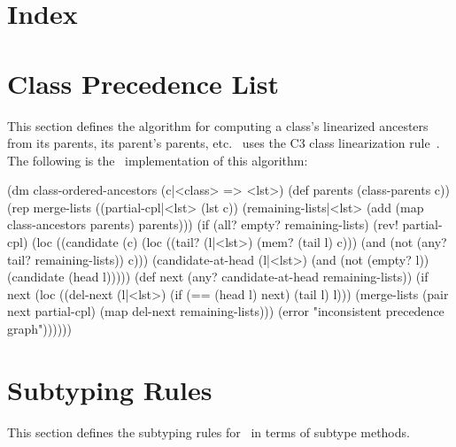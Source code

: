 \documentclass[twoside,twocolumn,9pt]{extarticle}
\begin{document}
\W\section*{Index}
\W\htmlprintindex




\texonly{
\appendix
}

\section{Class Precedence List}
\label{cpl}

This section defines the algorithm for computing a class's linearized
ancesters from its parents, its parent's parents, etc.  \goo\ uses
the C3 class linearization rule~\cite{dylan-cpl}.  The following is
the \goo\ implementation of this algorithm:

\begin{exv}
(dm class-ordered-ancestors (c|<class> => <lst>)
  (def parents (class-parents c))
  (rep merge-lists
      ((partial-cpl|<lst>     
         (lst c)) 
       (remaining-lists|<lst> 
         (add (map class-ancestors parents) parents)))
    (if (all? empty? remaining-lists)
        (rev! partial-cpl)
        (loc ((candidate (c) 
                (loc ((tail? (l|<lst>) (mem? (tail l) c)))
                  (and (not (any? tail? remaining-lists)) c)))
              (candidate-at-head (l|<lst>)
                (and (not (empty? l)) (candidate (head l)))))
          (def next (any? candidate-at-head remaining-lists))
          (if next
              (loc ((del-next (l|<lst>)
                      (if (== (head l) next) (tail l) l)))
                (merge-lists
                 (pair next partial-cpl) 
                 (map del-next remaining-lists)))
              (error "inconsistent precedence graph"))))))
\end{exv}

\section{Subtyping Rules}
\label{subtyping}

This section defines the subtyping rules for \goo\ in terms of subtype
methods.  
\end{document}
